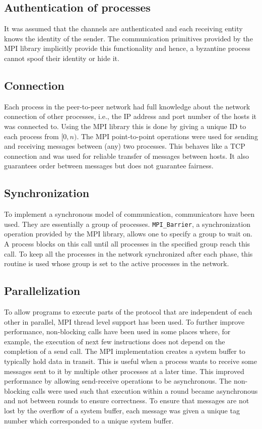 \subsection{Authentication of processes}
It was assumed that the channels are authenticated and each receiving entity knows the identity of the sender. The communication primitives provided by the MPI library implicitly provide this functionality and hence, a byzantine process cannot spoof their identity or hide it.

\subsection{Connection}
Each process in the peer-to-peer network had full knowledge about the network connection of other processes, i.e., the IP address and port number of the hosts it was connected to. Using the MPI library this is done by giving a unique ID to each process from $[0, n)$. The MPI point-to-point operations were used for sending and receiving messages between (any) two processes. This behaves like a TCP connection and was used for reliable transfer of messages between hosts. It also guarantees order between messages but does not guarantee fairness.%

\subsection{Synchronization}
To implement a synchronous model of communication, communicators have been used. They are essentially a group of processes. \texttt{MPI\_Barrier}, a synchronization operation provided by the MPI library, allows one to specify a group to wait on. A process blocks on this call until all processes in the specified group reach this call. To keep all the processes in the network synchronized after each phase, this routine is used whose group is set to the active processes in the network.

\subsection{Parallelization}
To allow programs to execute parts of the protocol that are independent of each other in parallel, MPI thread level support has been used. To further improve performance, non-blocking calls have been used in some places where, for example, the execution of next few instructions does not depend on the completion of a send call. The MPI implementation creates a system buffer to typically hold data in transit. This is useful when a process wants to receive some messages sent to it by multiple other processes at a later time. This improved performance by allowing send-receive operations to be asynchronous. The non-blocking calls were used such that execution within a round became asynchronous and not between rounds to ensure correctness. To ensure that messages are not lost by the overflow of a system buffer, each message was given a unique tag number which corresponded to a unique system buffer.


